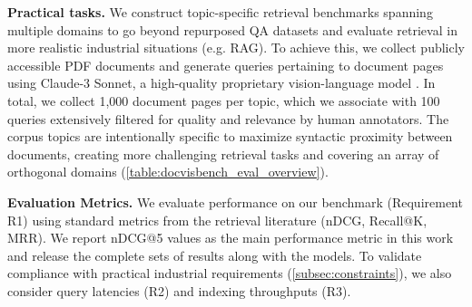 \label{paragraph:practical_tasks}
\noindent\textbf{Practical tasks.}
We construct topic-specific retrieval benchmarks spanning multiple domains to go beyond repurposed QA datasets and evaluate retrieval in more realistic industrial situations (e.g. RAG). To achieve this, we collect publicly accessible PDF documents and generate queries pertaining to document pages using Claude-3 Sonnet, a high-quality proprietary vision-language model . In total, we collect 1,000 document pages per topic, which we associate with 100 queries extensively filtered for quality and relevance by human annotators. The corpus topics are intentionally specific to maximize syntactic proximity between documents, creating more challenging retrieval tasks and covering an array of orthogonal domains (\autoref{table:docvisbench_eval_overview}). 


\label{paragraph:evaluation_metrics}
\noindent\textbf{Evaluation Metrics.}
We evaluate performance on our benchmark (Requirement R1) using standard metrics from the retrieval literature (nDCG, Recall@K, MRR). We report nDCG@5 values as the main performance metric in this work and release the complete sets of results along with the models. To validate compliance with practical industrial requirements (\autoref{subsec:constraints}), we also consider query latencies (R2) and indexing throughputs (R3).







